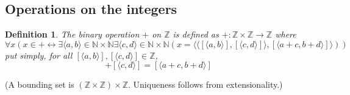 \documentclass{report}
\newtheorem{definition}[theo]{Definition}
\begin{document}
\subsection{Operations on the integers}
\begin{definition}
The binary operation $+$ on $\mathbb Z$ is defined as $+:\mathbb Z\times\mathbb Z\to\mathbb Z$ where
\begin{equation*}
\forall x(x\in+\leftrightarrow\exists\langle a,b\rangle\in\mathbb N\times\mathbb N\exists\langle c,d\rangle\in\mathbb N\times\mathbb N(x=\langle\langle[\langle a,b\rangle],[\langle c,d\rangle]\rangle,[\langle a+c,b+d\rangle]\rangle))
\end{equation*}
put simply, for all $[\langle a,b\rangle],[\langle c,d\rangle]\in\mathbb Z$,
\begin{equation*}
[\langle a,b\rangle]+[\langle c,d\rangle]=[\langle a+c,b+d\rangle]
\end{equation*}
\end{definition}
\noindent(A bounding set is $(\mathbb Z\times\mathbb Z)\times\mathbb Z$. Uniqueness follows from extensionality.)
\end{document}
